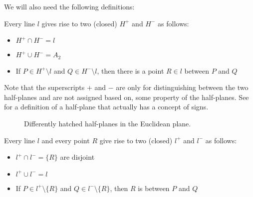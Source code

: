 \begin{definition}\label{def:euclidean_plane_auxiliary_definitions}
  We will also need the following definitions:
  \begin{thmenum}
     Every line \( l \) gives rise to two (closed)  \( H^+ \) and \( H^- \) as follows:
    \begin{itemize}
      \item \( H^+ \cap H^- = l \)
      \item \( H^+ \cup H^- = A_2 \)
      \item If \( P \in H^+ \setminus l \) and \( Q \in H^- \setminus l \), then there is a point \( R \in l \) between \( P \) and \( Q \)
    \end{itemize}

    Note that the superscripts \( + \) and \( - \) are only for distinguishing between the two half-planes and are not assigned based on, some property of the half-planes. See  for a definition of a half-plane that actually has a concept of signs.

    \begin{figure}
      \centering
      \iffalse\begin{mplibcode}
        input metapost/plotting;

        u := 1cm;

        beginfig(1);
        input hatching;

        path l, Hp, Hm;
        l = (0, -1) * u -- (3, 0) * u;
        draw l;

        Hp = l -- (3, 0.5) * u -- (0, 0.5) * u -- cycle;
        hatchfill Hp withcolor (45, 1mm, -.5bp);
        label.ulft("$H^+$", startpoint of l);

        Hm = l -- (3, -1.5) * u -- (0, -1.5) * u -- cycle;
        hatchfill Hm withcolor (135, 1mm, -.5bp);
        label.lrt("$H^-$", endpoint of l);
        endfig;
      \end{mplibcode}\fi

      \caption{Differently hatched half-planes in the Euclidean plane.}\label{def:affine_plane/bound_vector/half_plane}
    \end{figure}

     Every line \( l \) and every point \( R \) give rise to two (closed)  \( l^+ \) and \( l^- \) as follows:
    \begin{itemize}
      \item \( l^+ \cap l^- = \{ R \} \) are disjoint
      \item \( l^+ \cup l^- = l \)
      \item If \( P \in l^+ \setminus \{ R \} \) and \( Q \in l^- \setminus \{ R \} \), then \( R \) is between \( P \) and \( Q \)
    \end{itemize}


\end{thmenum}
\end{definition}
